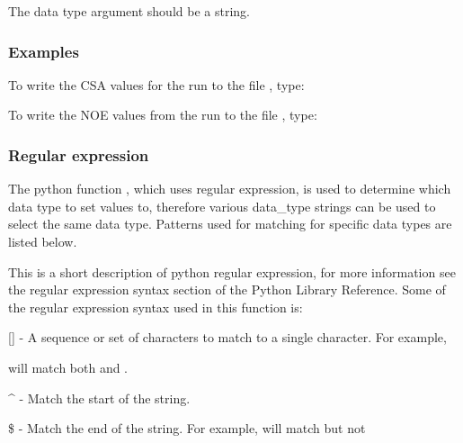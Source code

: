 The data type argument should be a string.


\subsubsection{Examples}

To write the CSA values for the run 
 to the file 
, type:





To write the NOE values from the run 
 to the file 
, type:









\subsubsection{Regular expression}

The python function 
, which uses regular expression, is used to determine which data
type to set values to, therefore various data\_type strings can be used to select the same
data type.  Patterns used for matching for specific data types are listed below.

This is a short description of python regular expression, for more information see the
regular expression syntax section of the Python Library Reference.  Some of the regular
expression syntax used in this function is:

    [] - A sequence or set of characters to match to a single character.  For example,
    
 will match both 
 and 
.

    \^{} - Match the start of the string.

    \$ - Match the end of the string.  For example, 
 will match 
 but not 

